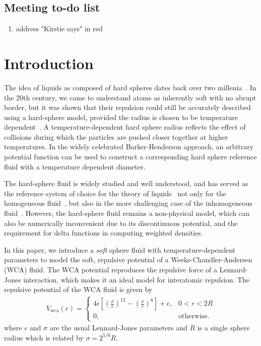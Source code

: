 \documentclass[letterpaper,twocolumn,amsmath,amssymb,prb]{revtex4-1}
\begin{document}
\subsection{Meeting to-do list}
\begin{enumerate}
\item address "Kirstie says" in red
\end{enumerate}


\section{Introduction}
The idea of liquids as composed of hard spheres dates back over two
millenia~\cite{lucretius}.  In the 20th century, we came to understand atoms as
inherently soft with no abrupt border, but it was shown that their repulsion
could still be accurately described using a hard-sphere model, provided the
radius is chosen to be temperature dependent~\cite{rowlinson1964statistical,
barker1967perturbation, andersen1971relationship}. A temperature-dependent hard
sphere radius reflects the effect of collisions during which the particles are
pushed closer together at higher temperatures. In the widely celebrated
Barker-Henderson approach, an arbitrary potential function can be used to
construct a corresponding hard sphere reference fluid with a temperature
dependent diameter.

The hard-sphere fluid is widely studied and well understood, and
has served as the reference system of choice for the theory of
liquids~\cite{gil-villegas-1997-SAFT-VR, clark2006developing,
  lafitte2013accurate} not only for the homogeneous
fluid~\cite{carnahan1969equation}, but also in the more challenging
case of the inhomogeneous fluid~\cite{rosenfeld1989, rosenfeld1997, 
roth2002whitebear}.  However, the hard-sphere fluid remains a
non-physical model, which can also be numerically inconvenient due to its
discontinuous potential, and the requirement for delta functions in
computing weighted densities.

In this paper, we introduce a \textit{soft} sphere fluid 
with temperature-dependent parameters to model the soft, repulsive 
potential of a Weeks-Chandler-Andersen (WCA) fluid. 
The WCA potential reproduces the repulsive force of a Lennard-Jones 
interaction, which makes it an ideal model for interatomic repulsion. 
The repulsive potential of the WCA fluid is given by 
\newcommand\erf{\mathrm{erf}}
\newcommand\Vwca{V_{\mathrm{wca}}}
\newcommand\Verf{V_{\erf}}
\begin{align}
  \Vwca(r) =
  \begin{cases}
    4\epsilon \left[ \left(\frac{\sigma}{r}\right)^{12} -
    \left(\frac{\sigma}{r}\right)^{6} \right] + \epsilon, & 0 < r < 2R \\
    0, & \textrm{otherwise}.
  \end{cases}
\label{eq:Vwca}
\end{align}
where $\epsilon$ and $\sigma$ are the usual Lennard-Jones parameters
and $R$ is a single sphere radius which is related by $\sigma =
2^{5/6} R$.
\end{document}
